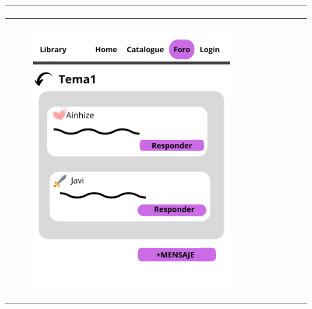 \documentclass{report}
\begin{document}
\begin{center}
\begin{longtable}{|p{\linewidth}|}
\begin{figure}[H]
                    \end{figure}\\
                    \hline
                    \begin{figure}[H]
                        \centering
                        \includegraphics[width=0.8\textwidth]{./img/grafico/Foro4.png}
                    \end{figure}\\
                    \hline
            \end{longtable}
        \end{center}
        \clearpage
\end{document}
